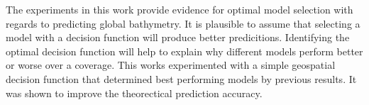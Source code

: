 The experiments in this work provide evidence for optimal model selection with regards to predicting global bathymetry.
It is plausible to assume that selecting a model with a decision function will produce better predicitions.
Identifying the optimal decision function will help to explain why different models perform better or worse over a coverage.
This works experimented with a simple geospatial decision function that determined best performing models by previous results.
It was shown to improve the theorectical prediction accuracy.
